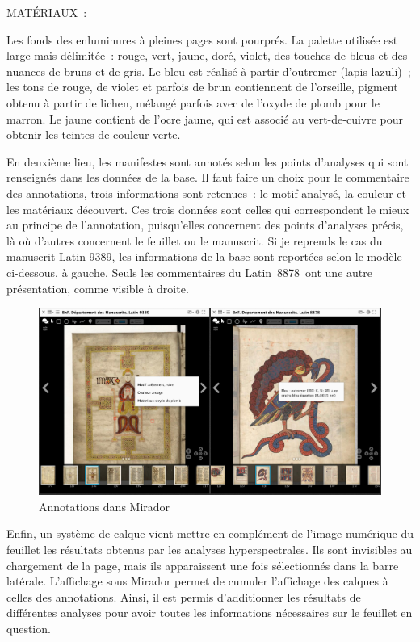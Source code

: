 \begin{mdframed}[style=graybox]
	MATÉRIAUX~:\par
	Les fonds des enluminures à pleines pages sont pourprés. La palette utilisée est large mais délimitée~: rouge, vert, jaune, doré, violet, des touches de bleus et des nuances de bruns et de gris. Le bleu est réalisé à partir d’outremer (lapis-lazuli)~; les tons de rouge, de violet et parfois de brun contiennent de l’orseille, pigment obtenu à partir de lichen, mélangé parfois avec de l’oxyde de plomb pour le marron. Le jaune contient de l’ocre jaune, qui est associé au vert-de-cuivre pour obtenir les teintes de couleur verte.\\\par
\end{mdframed}

En deuxième lieu, les manifestes sont annotés selon les points d’analyses qui sont renseignés dans les données de la base. Il faut faire un choix pour le commentaire des annotations, trois informations sont retenues~: le motif analysé, la couleur et les matériaux découvert. Ces trois données sont celles qui correspondent le mieux au principe de l’annotation, puisqu’elles concernent des points d’analyses précis, là où d’autres concernent le feuillet ou le manuscrit. Si je reprends le cas du manuscrit Latin 9389, les informations de la base sont reportées selon le modèle ci-dessous, à gauche. Seuls les commentaires du Latin 8878 ont une autre présentation, comme visible à droite.\par
\begin{figure}[H]
	\centering
	\includegraphics[width=\textwidth]{./textes/chap4/iiif-annot.jpg}
	\caption{Annotations dans Mirador}
	\label{fig:info}
\end{figure}
Enfin, un système de calque vient mettre en complément de l’image numérique du feuillet les résultats obtenus par les analyses hyperspectrales. Ils sont invisibles au chargement de la page, mais ils apparaissent une fois sélectionnés dans la barre latérale. L’affichage sous Mirador permet de cumuler l’affichage des calques à celles des annotations. Ainsi, il est permis d’additionner les résultats de différentes analyses pour avoir toutes les informations nécessaires sur le feuillet en question.\par
